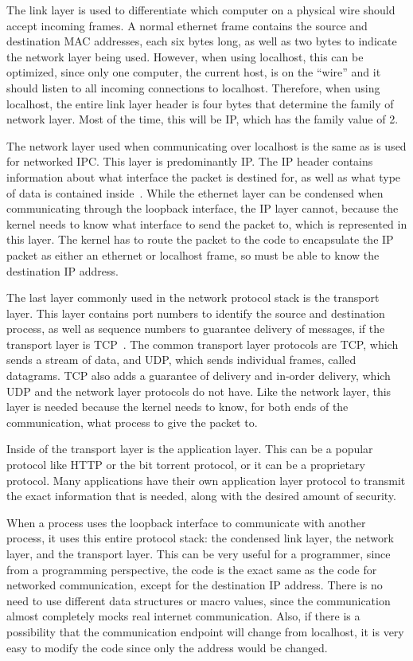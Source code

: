 The link layer is used to differentiate which computer on a physical wire should accept incoming frames.  A normal ethernet frame contains the source and destination MAC addresses, each six bytes long, as well as two bytes to indicate the network layer being used.  However, when using localhost, this can be optimized, since only one computer, the current host, is on the ``wire'' and it should listen to all incoming connections to localhost.  Therefore, when using localhost, the entire link layer header is four bytes that determine the family of network layer.  Most of the time, this will be IP, which has the family value of 2.

The network layer used when communicating over localhost is the same as is used for networked IPC.  This layer is predominantly IP.  The IP header contains information about what interface the packet is destined for, as well as what type of data is contained inside~\cite{RFC0791}.  While the ethernet layer can be condensed when communicating through the loopback interface, the IP layer cannot, because the kernel needs to know what interface to send the packet to, which is represented in this layer.  The kernel has to route the packet to the code to encapsulate the IP packet as either an ethernet or localhost frame, so must be able to know the destination IP address.

The last layer commonly used in the network protocol stack is the transport layer.  This layer contains port numbers to identify the source and destination process, as well as sequence numbers to guarantee delivery of messages, if the transport layer is TCP~\cite{RFC0793}.  The common transport layer protocols are TCP, which sends a stream of data, and UDP, which sends individual frames, called datagrams.  TCP also adds a guarantee of delivery and in-order delivery, which UDP and the network layer protocols do not have.  Like the network layer, this layer is needed because the kernel needs to know, for both ends of the communication, what process to give the packet to.

Inside of the transport layer is the application layer.  This can be a popular protocol like HTTP or the bit torrent protocol, or it can be a proprietary protocol.  Many applications have their own application layer protocol to transmit the exact information that is needed, along with the desired amount of security.

When a process uses the loopback interface to communicate with another process, it uses this entire protocol stack: the condensed link layer, the network layer, and the transport layer.  This can be very useful for a programmer, since from a programming perspective, the code is the exact same as the code for networked communication, except for the destination IP address.  There is no need to use different data structures or macro values, since the communication almost completely mocks real internet communication.  Also, if there is a possibility that the communication endpoint will change from localhost, it is very easy to modify the code since only the address would be changed.

